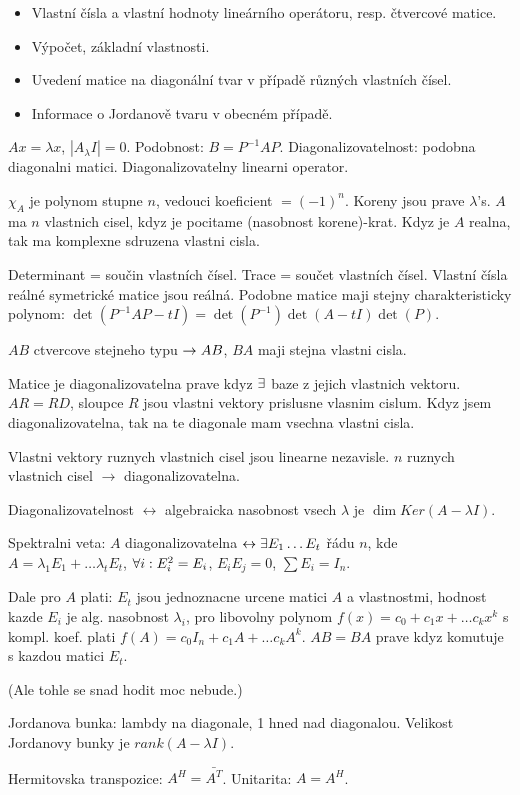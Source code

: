 \begin{itemize}
\item Vlastní čísla a vlastní hodnoty lineárního operátoru, resp. čtvercové
matice.
\item Výpočet, základní vlastnosti.
\item Uvedení matice na diagonální tvar v případě různých vlastních čísel.
\item Informace o Jordanově tvaru v obecném případě.
\end{itemize}

$Ax=\lambda x$, $|A_\lambda I|=0$.
Podobnost: $B=P^{-1} AP$.
Diagonalizovatelnost: podobna diagonalni matici.
Diagonalizovatelny linearni operator.

$\chi_A$ je polynom stupne $n$, vedouci koeficient $=(-1)^n$.
Koreny jsou prave $\lambda$'s.
$A$ ma $n$ vlastnich cisel, kdyz je pocitame (nasobnost korene)-krat.
Kdyz je $A$ realna, tak ma komplexne sdruzena vlastni cisla.

Determinant = součin vlastních čísel.
Trace = součet vlastních čísel.
Vlastní čísla reálné symetrické matice jsou reálná.
Podobne matice maji stejny charakteristicky polynom:
$\det(P^{-1}AP-tI)=\det(P^{-1})\det(A-tI)\det(P)$.

$AB$ ctvercove stejneho typu $\rightarrow AB$, $BA$ maji stejna vlastni cisla.

Matice je diagonalizovatelna prave kdyz $\exists$ baze z jejich vlastnich vektoru.
$AR=RD$, sloupce $R$ jsou vlastni vektory prislusne vlasnim cislum.
Kdyz jsem diagonalizovatelna, tak na te diagonale mam vsechna vlastni cisla.

Vlastni vektory ruznych vlastnich cisel jsou linearne nezavisle.
$n$ ruznych vlastnich cisel $\rightarrow$ diagonalizovatelna.

Diagonalizovatelnost $\leftrightarrow$
algebraicka nasobnost vsech $\lambda$ je $\dim Ker(A-\lambda I)$.

Spektralni veta: $A$ diagonalizovatelna $\leftrightarrow \exists E_1\ldots E_t$
řádu $n$, kde $A=\lambda_1 E_1+\ldots \lambda_t E_t$,
$\forall i: E_i^2=E_i$, $E_i E_j=0$, $\sum E_i=I_n$.

Dale pro $A$ plati: $E_t$ jsou jednoznacne urcene matici $A$ a vlastnostmi,
hodnost kazde $E_i$ je alg. nasobnost $\lambda_i$,
pro libovolny polynom $f(x)=c_0+c_1 x+\ldots c_k x^k$ s kompl. koef. plati
$f(A)=c_0 I_n + c_1 A+\ldots c_k A^k$.
$AB=BA$ prave kdyz komutuje s kazdou matici $E_t$.

(Ale tohle se snad hodit moc nebude.)

Jordanova bunka: lambdy na diagonale, 1 hned nad diagonalou.
Velikost Jordanovy bunky je $rank(A-\lambda I)$.

Hermitovska transpozice: $A^H=\bar{A^T}$. Unitarita: $A=A^H$.
